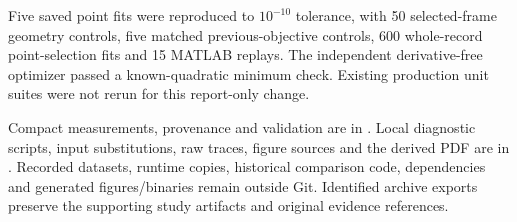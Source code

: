 \documentclass[11pt]{article}
\begin{document}
Five saved point fits were reproduced to $10^{-10}$ tolerance, with 50
selected-frame geometry controls, five matched previous-objective controls,
600 whole-record point-selection fits and 15 MATLAB replays. The independent
derivative-free optimizer passed a known-quadratic minimum check. Existing
production unit suites were not rerun for this report-only change.

Compact measurements, provenance and validation are in
. Local diagnostic
scripts, input substitutions, raw traces, figure sources and the derived PDF
are in . Recorded
datasets, runtime copies, historical comparison code, dependencies and
generated figures/binaries remain outside Git. Identified archive exports
preserve the supporting study artifacts and original evidence references.
\end{document}
